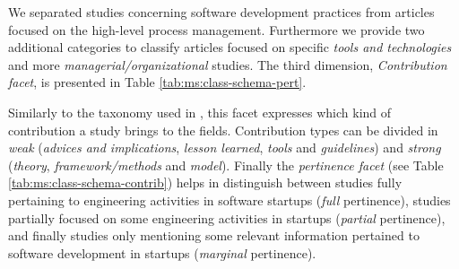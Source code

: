 \documentclass[final,5p,times,twocolumn]{elsarticle}
\begin{document}

We separated studies concerning software development practices from articles focused on the high-level process management. Furthermore we provide two additional categories to classify articles focused on specific \textit{tools and technologies} and more \textit{managerial/organizational} studies. The third dimension, \textit{Contribution facet}, is presented in Table \ref{tab:ms:class-schema-pert}.



Similarly to the taxonomy used in \cite{Shaw2003}, this facet expresses which kind of contribution a study brings to the fields. Contribution types can be divided in  \textit{weak} (\textit{advices and implications},  \textit{lesson learned},  \textit{tools} and  \textit{guidelines}) and \textit{strong} (\textit{theory}, \textit{framework/methods} and \textit{model}).
Finally the \textit{pertinence facet} (see Table \ref{tab:ms:class-schema-contrib}) helps in distinguish between studies fully pertaining to engineering activities in software startups (\textit{full} pertinence), studies partially focused on some engineering activities in startups (\textit{partial} pertinence), and finally studies only mentioning some relevant information pertained to software development in startups (\textit{marginal} pertinence).  
\end{document}

